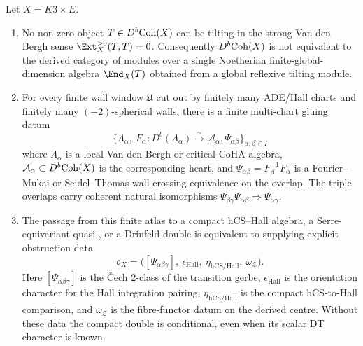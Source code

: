 \begin{theorem}
\label{thm:cy-c-beyond-k3e-global-nccr-obstruction}
Let $X=K3\times E$.
\begin{enumerate}[label=\textup{(\roman*)}]
 \item No non-zero object $T\in D^b\mathrm{Coh}(X)$ can be tilting in the
 strong Van den Bergh sense $\Ext_X^{>0}(T,T)=0$. Consequently
 $D^b\mathrm{Coh}(X)$ is not equivalent to the derived category of modules
 over a single Noetherian finite-global-dimension algebra
 $\End_X(T)$ obtained from a global reflexive tilting module.
 \item For every finite wall window $\mathfrak U$ cut out by finitely
 many ADE/Hall charts and finitely many $(-2)$-spherical walls, there
 is a finite multi-chart gluing datum
 \[
  \bigl\{\Lambda_\alpha,\ F_\alpha:D^b(\Lambda_\alpha)
  \xrightarrow{\sim} \mathcal A_\alpha,
  \Psi_{\alpha\beta}\bigr\}_{\alpha,\beta\in I}
 \]
 where $\Lambda_\alpha$ is a local Van den Bergh or critical-CoHA
 algebra, $\mathcal A_\alpha\subset D^b\mathrm{Coh}(X)$ is the corresponding
 heart, and
 $\Psi_{\alpha\beta}=F_\beta^{-1}F_\alpha$ is a Fourier--Mukai or
 Seidel--Thomas wall-crossing equivalence on the overlap. The triple
 overlaps carry coherent natural isomorphisms
 $\Psi_{\beta\gamma}\Psi_{\alpha\beta}\Rightarrow\Psi_{\alpha\gamma}$.
 \item The passage from this finite atlas to a compact hCS--Hall
 algebra, a Serre-equivariant quasi-\NCCR, or a Drinfeld double is
 equivalent to supplying explicit obstruction data
 \[
  \mathfrak o_X
  =
  \bigl(
   [\Psi_{\alpha\beta\gamma}],\
   \epsilon_{\mathrm{Hall}},\
   \eta_{\mathrm{hCS/Hall}},\
   \omega_{\mathcal Z}
  \bigr).
 \]
 Here $[\Psi_{\alpha\beta\gamma}]$ is the \v{C}ech $2$-class of the
 transition gerbe, $\epsilon_{\mathrm{Hall}}$ is the orientation
 character for the Hall integration pairing,
 $\eta_{\mathrm{hCS/Hall}}$ is the compact hCS-to-Hall comparison, and
 $\omega_{\mathcal Z}$ is the fibre-functor datum on the derived
 centre. Without these data the compact double is conditional, even
 when its scalar DT character is known.
\end{enumerate}
\end{theorem}

